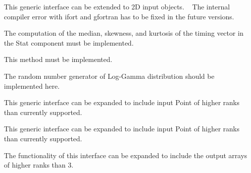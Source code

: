 
\begin{DoxyRefList}
\item[Type \mbox{\hyperlink{interfaceArrayReplace__mod_1_1replace}{Array\+Replace\+\_\+mod\+::replace}} ]\label{todo__todo000001}%
%
 This generic interface can be extended to 2D input objects. ~\newline
 The internal compiler error with {\ttfamily ifort} and {\ttfamily gfortran} has to be fixed in the future versions. ~\newline
 
\item[Subprogram \mbox{\hyperlink{namespaceBench__mod_a2964c54e2b3af9b2c746253e5759d2fe}{Bench\+\_\+mod\+::time\+Exec}} (Bench, Timing, minsec, niter)]\label{todo__todo000002}%
%
 The computation of the median, skewness, and kurtosis of the timing vector in the Stat component must be implemented. 
\item[Subprogram \mbox{\hyperlink{namespaceDistMultiNorm__mod_abc50852f3f4a65e6dee14e501df15a60}{Dist\+Multi\+Norm\+\_\+mod\+::logpdf}} (self, Point)]\label{todo__todo000003}%
%
 This method must be implemented. 
\item[Subprogram \mbox{\hyperlink{namespaceDistUniLogGamma__mod_acc6e60c6fa66c784f1f801eb419ecbff}{Dist\+Uni\+Log\+Gamma\+\_\+mod\+::rand}} (self)]\label{todo__todo000004}%
%
 The random number generator of Log-\/\+Gamma distribution should be implemented here.  
\item[Type \mbox{\hyperlink{interfaceDistUniNorm__mod_1_1genNormCDF}{Dist\+Uni\+Norm\+\_\+mod\+::gen\+Norm\+CDF}} ]\label{todo__todo000005}%
%
 This generic interface can be expanded to include input {\ttfamily Point} of higher ranks than currently supported. 
\item[Type \mbox{\hyperlink{interfaceDistUniNorm__mod_1_1genNormLogPDF}{Dist\+Uni\+Norm\+\_\+mod\+::gen\+Norm\+Log\+PDF}} ]\label{todo__todo000006}%
%
 This generic interface can be expanded to include input {\ttfamily Point} of higher ranks than currently supported. 
\item[Type \mbox{\hyperlink{interfaceDistUniNorm__mod_1_1getNormRand}{Dist\+Uni\+Norm\+\_\+mod\+::get\+Norm\+Rand}} ]\label{todo__todo000007}%
%
 The functionality of this interface can be expanded to include the output arrays of higher ranks than 3. 
\item[Subprogram \mbox{\hyperlink{namespaceFitGeoCyclic__mod_a1c31498edcd69664be787f9942aaecea}{Fit\+Geo\+Cyclic\+\_\+mod\+::fit\+Geo\+Cyclic\+Log\+PDF}} (max\+Num\+Trial, num\+Trial, Success\+Step, Log\+Count)]\label{todo__todo000008}%

\end{DoxyRefList}
